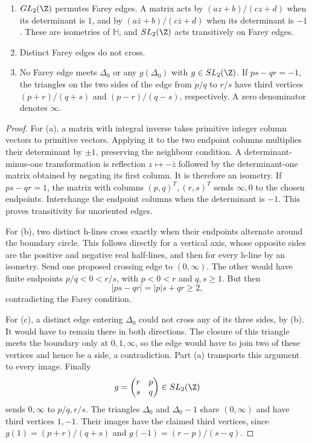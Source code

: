 \begin{proposition}\label{prop:farey}
\begin{enumerate}
\item[(a)] $GL_2(\Z)$ permutes Farey edges. A matrix acts by $(az+b)/(cz+d)$ when its determinant is $1$, and by $(a\bar z+b)/(c\bar z+d)$ when its determinant is $-1$. These are isometries of $\mathbb H$, and $SL_2(\Z)$ acts transitively on Farey edges.
\item[(b)] Distinct Farey edges do not cross.
\item[(c)] No Farey edge meets $\Delta_0$ or any $g(\Delta_0)$ with $g\in SL_2(\Z)$. If $ps-qr=-1$, the triangles on the two sides of the edge from $p/q$ to $r/s$ have third vertices $(p+r)/(q+s)$ and $(p-r)/(q-s)$, respectively. A zero denominator denotes $\infty$.
\end{enumerate}
\end{proposition}

\begin{proof}
For (a), a matrix with integral inverse takes primitive integer column vectors to primitive vectors. Applying it to the two endpoint columns multiplies their determinant by $\pm1$, preserving the neighbour condition. A determinant-minus-one transformation is reflection $z\mapsto-\bar z$ followed by the determinant-one matrix obtained by negating its first column. It is therefore an isometry. If $ps-qr=1$, the matrix with columns $(p,q)^T,(r,s)^T$ sends $\infty,0$ to the chosen endpoints. Interchange the endpoint columns when the determinant is $-1$. This proves transitivity for unoriented edges.

For (b), two distinct h-lines cross exactly when their endpoints alternate around the boundary circle. This follows directly for a vertical axis, whose opposite sides are the positive and negative real half-lines, and then for every h-line by an isometry. Send one proposed crossing edge to $(0,\infty)$. The other would have finite endpoints $p/q<0<r/s$, with $p<0<r$ and $q,s\ge1$. But then
\[
|ps-qr|=|p|s+qr\ge2,
\]
contradicting the Farey condition.

For (c), a distinct edge entering $\Delta_0$ could not cross any of its three sides, by (b). It would have to remain there in both directions. The closure of this triangle meets the boundary only at $0,1,\infty$, so the edge would have to join two of these vertices and hence be a side, a contradiction. Part (a) transports this argument to every image. Finally
\[
g=\begin{pmatrix}r&p\\s&q\end{pmatrix}\in SL_2(\Z)
\]
sends $0,\infty$ to $p/q,r/s$. The triangles $\Delta_0$ and $\Delta_0-1$ share $(0,\infty)$ and have third vertices $1,-1$. Their images have the claimed third vertices, since $g(1)=(p+r)/(q+s)$ and $g(-1)=(r-p)/(s-q)$.
\end{proof}

